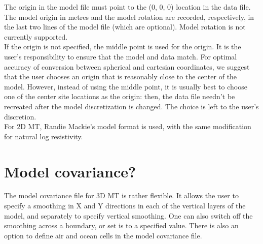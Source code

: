 \documentclass[12pt]{article}
\begin{document}
The origin in the model file must point to the (0, 0, 0) location in the data file. The model origin in metres and the model rotation are recorded, respectively, in the last two lines of the model file (which are optional). Model rotation is not currently supported.\\

If the origin is not specified, the middle point is used for the origin. It is the user's responsibility to ensure that the model and data match. For optimal accuracy of conversion between spherical and cartesian coordinates, we suggest that the user chooses an origin that is reasonably close to the center of the model. However, instead of using the middle point, it is usually best to choose one of the center site locations as the origin: then, the data file needn't be recreated after the model discretization is changed. The choice is left to the user's discretion.\\

For 2D MT, Randie Mackie's model format is used, with the same modification for natural log resistivity.

\section{Model covariance?}

The model covariance file for 3D MT is rather flexible. It allows the user to specify a smoothing in X and Y directions in each of the vertical layers of the model, and separately to specify vertical smoothing. One can also switch off the smoothing across a boundary, or set is to a specified value. There is also an option to define air and ocean cells in the model covariance file.\\
\end{document}
